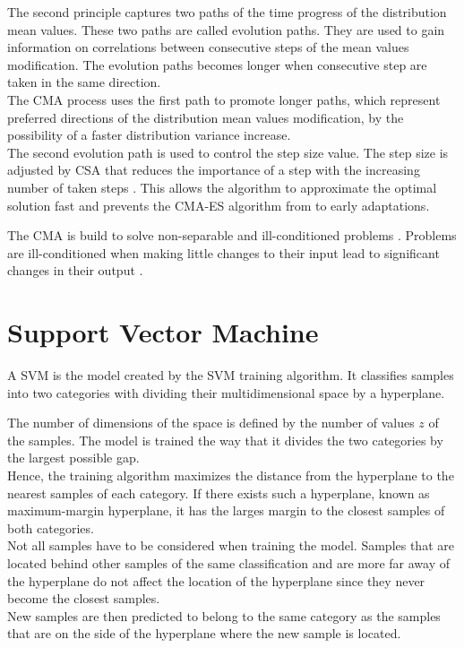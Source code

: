 The second principle captures two paths of the time progress of the distribution mean values.
These two paths are called evolution paths.
They are used to gain information on correlations between consecutive steps of the mean values modification.
The evolution paths becomes longer when consecutive step are taken in the same direction.\\
The \ac{CMA} process uses the first path to promote longer paths, which represent preferred directions of the distribution mean values modification, by the possibility of a faster distribution variance increase.\\
The second evolution path is used to control the step size value.
The step size is adjusted by \ac{CSA} that reduces the importance of a step with the increasing number of taken steps \cite{Chotard2012CumulativeFunctions}.
This allows the algorithm to approximate the optimal solution fast and prevents the \ac{CMA-ES} algorithm from to early adaptations. 

The \ac{CMA} is build to solve non-separable and ill-conditioned problems \cite{Hansen2011TheTutorial}.
Problems are ill-conditioned when making little changes to their input lead to significant changes in their output \cite{2016ConditionNumber}.


\section{Support Vector Machine}
\label{sec:svm}

A \acf{SVM} is the model created by the \ac{SVM} training algorithm.
It classifies samples into two categories with dividing their multidimensional space by a hyperplane. %

The number of dimensions of the space is defined by the number of values $z$ of the samples.
The model is trained the way that it divides the two categories by the largest possible gap.\\
Hence, the training algorithm maximizes the distance from the hyperplane to the nearest samples of each category.
If there exists such a hyperplane, known as maximum-margin hyperplane, it has the larges margin to the closest samples of both categories.\\
Not all samples have to be considered when training the model.
Samples that are located behind other samples of the same classification and are more far away of the hyperplane do not affect the location of the hyperplane since they never become the closest samples.\\
New samples are then predicted to belong to the same category as the samples that are on the side of the hyperplane where the new sample is located.

